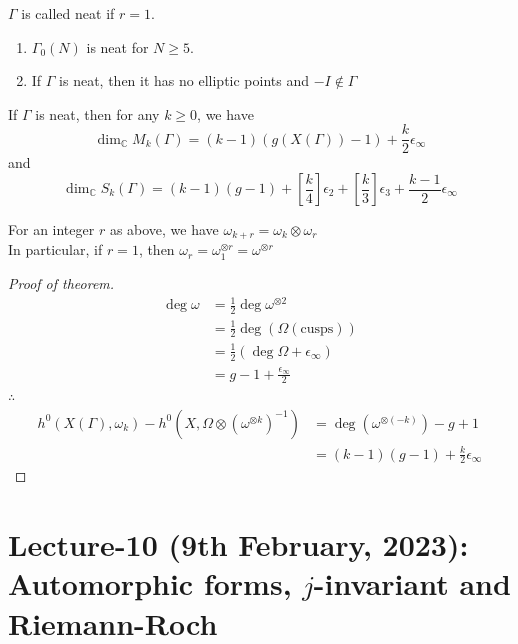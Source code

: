 \documentclass[oneside, 12pt]{scrbook}
\newcommand{\CC}{\mathbb C}
\theoremstyle{theorem}
\begin{document}
\begin{definition}
$\Gamma$ is called neat if $r=1$.
\end{definition}

\begin{exercise}
\begin{enumerate}
\item $\Gamma_{0}(N)$ is neat for $N \geq 5$.
\item If $\Gamma$ is neat, then it has no elliptic points and $-I \not \in \Gamma$
\end{enumerate}
\end{exercise}

\begin{theorem}
If $\Gamma$ is neat, then for any $k \geq 0$, we have $$\dim_{\CC} M_{k}(\Gamma) = (k-1)(g(X(\Gamma))-1) + \frac{k}{2} \epsilon_{\infty}$$ and $$\dim_{\CC} S_{k}(\Gamma) = (k-1)(g-1) + \left[ \frac{k}{4} \right] \epsilon_{2} + \left[ \frac{k}{3} \right] \epsilon_{3} + \frac{k-1}{2} \epsilon_{\infty}$$
\end{theorem}

\begin{remark}[Fact]
For an integer $r$ as above, we have $\omega_{k + r} = \omega_{k} \otimes \omega_{r}$ \\

In particular, if $r=1$, then $\omega_{r} = \omega_{1}^{\otimes r}  = \omega^{\otimes r}$
\end{remark}

\begin{proof}[Proof of theorem]
\begin{align*}
\deg \omega &= \frac{1}{2} \deg \omega^{\otimes 2} \\
&= \frac{1}{2} \deg (\Omega(\text{cusps})) \\
&= \frac{1}{2} (\deg \Omega + \epsilon_{\infty}) \\
&= g-1 + \frac{\epsilon_{\infty}}{2}
\end{align*}
$\therefore$
\begin{align*}
h^{0}(X(\Gamma), \omega_{k}) - h^{0}(X, \Omega \otimes (\omega^{\otimes k})^{-1}) &= \deg (\omega^{\otimes (-k)}) - g + 1 \\
&= (k-1)(g-1) + \frac{k}{2} \epsilon_{\infty}
\end{align*}
\end{proof}


\chapter{Lecture-10 (9th February, 2023): Automorphic forms, $j$-invariant and Riemann-Roch}
\end{document}
